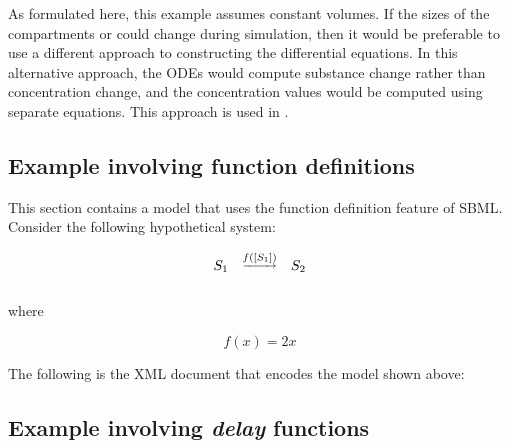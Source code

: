 As formulated here, this example assumes constant volumes.  If the
sizes of the compartments  or  could
change during simulation, then it would be preferable to use a
different approach to constructing the differential equations.  In
this alternative approach, the ODEs would compute substance change
rather than concentration change, and the concentration values
would be computed using separate equations.  This approach is used
in .


\subsection{Example involving function definitions}
\label{sec:functioneg}

This section contains a model that uses the function definition
feature of SBML.  Consider the following hypothetical system:
\begin{linenomath}
\begin{equation*}
  \begin{array}{@{}ccc@{}}
    S_1 & \overset{\underrightarrow{f([S_1])}}{} & S_2 \\ \\[-4pt]
  \end{array}
\end{equation*}
\end{linenomath}
where
\begin{linenomath}
\begin{equation*}
    f(x) = 2 x
\end{equation*}
\end{linenomath}

The following is the XML document that encodes the model shown
above:



\subsection{Example involving \emph{delay} functions}
\label{sec:delayeg}

